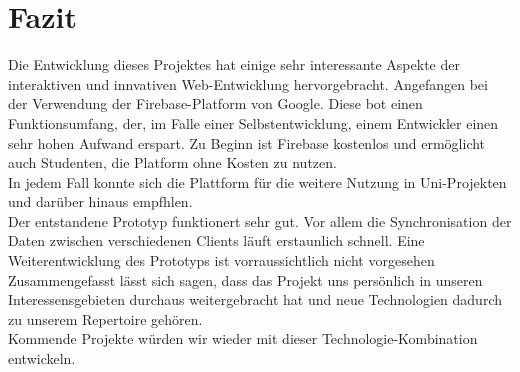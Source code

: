 \chapter{Fazit}
Die Entwicklung dieses Projektes hat einige sehr interessante Aspekte der interaktiven und innvativen Web-Entwicklung hervorgebracht.
Angefangen bei der Verwendung der Firebase-Platform von Google. Diese bot einen Funktionsumfang, der, im Falle einer Selbstentwicklung,
einem Entwickler einen sehr hohen Aufwand erspart. Zu Beginn ist Firebase kostenlos und ermöglicht auch Studenten, die Platform ohne Kosten zu nutzen.\\
In jedem Fall konnte sich die Plattform für die weitere Nutzung in Uni-Projekten und darüber hinaus empfhlen.
\\
Der entstandene Prototyp funktionert sehr gut. Vor allem die Synchronisation der Daten zwischen verschiedenen Clients läuft erstaunlich schnell.
Eine Weiterentwicklung des Prototyps ist vorraussichtlich nicht vorgesehen
\\
Zusammengefasst lässt sich sagen, dass das Projekt uns persönlich in unseren Interessensgebieten durchaus weitergebracht hat und neue Technologien dadurch zu unserem
Repertoire gehören.\\
Kommende Projekte würden wir wieder mit dieser Technologie-Kombination entwickeln.
